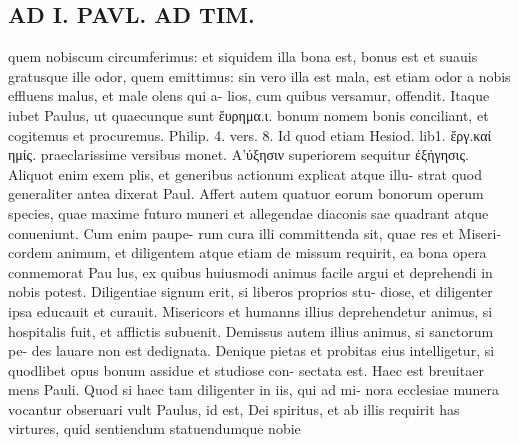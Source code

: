 \documentclass{article}
\begin{document}
\begin{pages}
\section*{AD I. PAVL. AD TIM. }
\marginpar{[ p.278 ]}quem nobiscum circumferimus: et siquidem illa bona est, bonus est et suauis gratusque ille odor, quem emittimus: sin vero illa est mala, est etiam odor a nobis effluens malus, et male olens qui a- lios, cum quibus versamur, offendit. Itaque iubet Paulus, ut quaecunque sunt ἕυρημα.ι. bonum nomem bonis conciliant, et cogitemus et procuremus. Philip. 4. vers. 8. Id quod etiam Hesiod. lib1. ἔργ.καί ημίς. praeclarissime versibus monet. Α’ύξησιν superiorem sequitur ἐξήγησις. Aliquot enim exem plis, et generibus actionum explicat atque illu- strat quod generaliter antea dixerat Paul. Affert autem quatuor eorum bonorum operum species, quae maxime futuro muneri et allegendae diaconis sae quadrant atque conueniunt. Cum enim paupe- rum cura illi committenda sit, quae res et Miseri- cordem animum, et diligentem atque etiam de missum requirit, ea bona opera conmemorat Pau lus, ex quibus huiusmodi animus facile argui et deprehendi in nobis potest. Diligentiae signum erit, si liberos proprios stu- diose, et diligenter ipsa educauit et curauit.  Misericors et humanns illius deprehendetur animus, si hospitalis fuit, et afflictis subuenit. Demissus autem illius animus, si sanctorum pe- des lauare non est dedignata. Denique pietas et probitas eius intelligetur, si quodlibet opus bonum assidue et studiose con- sectata est. Haec est breuitaer mens Pauli. Quod si haec tam diligenter in iis, qui ad mi- nora ecclesiae munera vocantur obseruari vult Paulus, id est, Dei spiritus, et ab illis requirit has virtures, quid sentiendum statuendumque nobie 

\end{pages}
\end{document}
